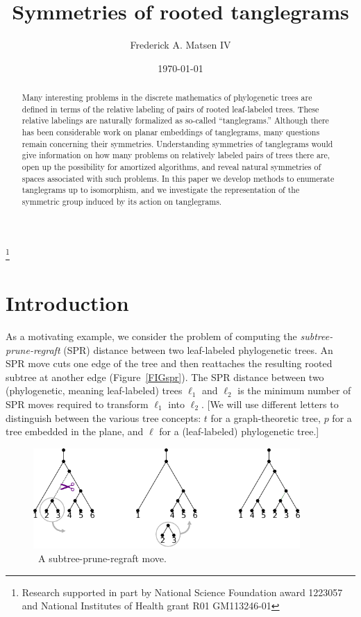 \documentclass{amsart}
\newcommand{\arxiv}[1]{#1}
\newcommand{\FIGspr}{\
\label{FIGspr}
\begin{figure}
  \arxiv{\includegraphics[width=4in]{figures/spr-definition}}
\caption{\
  A subtree-prune-regraft move.
}
\end{figure}
}
\begin{document}
\title{Symmetries of rooted tanglegrams}
\author[Matsen]{Frederick A. Matsen IV}
\address{Fred Hutchinson Cancer Research Center \\ Seattle, WA}
\thanks{Research supported in part by National Science Foundation award 1223057 and National Institutes of Health grant R01 GM113246-01}


\date{\today}

\begin{abstract}
Many interesting problems in the discrete mathematics of phylogenetic trees are defined in terms of the relative labeling of pairs of rooted leaf-labeled trees.
These relative labelings are naturally formalized as so-called ``tanglegrams.''
Although there has been considerable work on planar embeddings of tanglegrams, many questions remain concerning their symmetries.
Understanding symmetries of tanglegrams would give information on how many problems on relatively labeled pairs of trees there are, open up the possibility for amortized algorithms, and reveal natural symmetries of spaces associated with such problems.
In this paper we develop methods to enumerate tanglegrams up to isomorphism, and we investigate the representation of the symmetric group induced by its action on tanglegrams.
\end{abstract}

\maketitle


\section{Introduction}
As a motivating example, we consider the problem of computing the \emph{subtree-prune-regraft} (SPR) distance between two leaf-labeled phylogenetic trees.
An SPR move cuts one edge of the tree and then reattaches the resulting rooted subtree at another edge (Figure~\ref{FIGspr}).
The SPR distance between two (phylogenetic, meaning leaf-labeled) trees $\ell_1$ and $\ell_2$ is the minimum number of SPR moves required to transform $\ell_1$ into $\ell_2$.
[We will use different letters to distinguish between the various tree concepts: $t$ for a graph-theoretic tree, $p$ for a tree embedded in the plane, and $\ell$ for a (leaf-labeled) phylogenetic tree.]
\FIGspr
\end{document}
